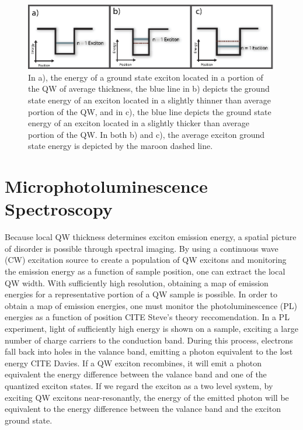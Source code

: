 \newpage
\begin{figure}[t!]
\label{rel-thickness}
\centering
\includegraphics[width = .9\textwidth]{rel-thickness.eps}
\caption{\doublespacing In a), the energy of a ground state exciton located in a portion of the QW of average thickness, the blue line in b) depicts the ground state energy of an exciton located in a slightly thinner than average portion of the QW,  and in c), the blue line depicts the ground state energy of an exciton located in a slightly thicker than average portion of the QW. In both b) and c), the average exciton ground state energy is depicted by the maroon dashed line.}
\end{figure}




\section{Microphotoluminescence Spectroscopy}
\indent Because local QW thickness determines exciton emission energy, a spatial picture of disorder is possible through spectral imaging. By using a continuous wave (CW) excitation source to create a population of QW excitons and monitoring the emission energy as a function of sample position, one can extract the local QW width. With sufficiently high resolution, obtaining a map of emission energies for a representative portion of a QW sample is possible. In order to obtain a map of emission energies, one must monitor the photoluminescence (PL) energies as a function of position CITE Steve's theory reccomendation. In a PL experiment, light of sufficiently high energy is shown on a sample, exciting a large number of charge carriers to the conduction band. During this process, electrons fall back into holes in the valance band, emitting a photon equivalent to the lost energy CITE Davies. If a QW exciton recombines, it will emit a photon equivalent the energy difference between the valance band and one of the quantized exciton states. If we regard the exciton as a two level system, by exciting QW excitons near-resonantly, the energy of the emitted photon will be equivalent to the energy difference between the valance band and the exciton ground state. 

